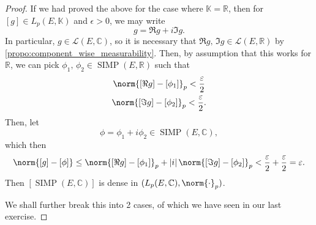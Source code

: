 \documentclass[notoc,notitlepage]{tufte-book}
\DeclareMathOperator{\SIMP}{SIMP}
\begin{document}
\begin{proof}
  If we had proved the above for the case where $\mathbb{K} = \mathbb{R}$,
  then for $[g] \in L_p(E, \mathbb{K})$ and $\epsilon > 0$,
  we may write
  \begin{equation*}
    g = \Re g + i \Im g.
  \end{equation*}
  In particular, $g \in \mathcal{L}(E, \mathbb{C})$,
  so it is necessary that $\Re g,\, \Im g \in \mathcal{L}(E, \mathbb{R})$ by
  \cref{propo:component_wise_measurability}.
  Then, by assumption that this works for $\mathbb{R}$,
  we can pick $\phi_1,\, \phi_2 \in \SIMP(E, \mathbb{R})$ such that
  \begin{gather*}
    \norm{[\Re g] - [\phi_1]}_p < \frac{\epsilon}{2} \\
    \norm{[\Im g] - [\phi_2]}_p < \frac{\epsilon}{2}.
  \end{gather*}
  Then, let
  \begin{equation*}
    \phi = \phi_1 + i \phi_2 \in \SIMP(E, \mathbb{C}),
  \end{equation*}
  which then
  \begin{equation*}
    \norm{[g] - [\phi]} \leq \norm{[\Re g] - [\phi_1]}_p + \abs{i} \norm{[\Im g] -
    [\phi_2]}_p < \frac{\epsilon}{2} + \frac{\epsilon}{2} = \epsilon.
  \end{equation*}
  Then $[\SIMP(E, \mathbb{C})]$ is dense in $(L_p(E, \mathbb{C}), \norm{\cdot}_p)$.

  \noindent
  We shall further break this into 2 cases,
  of which we have seen in our last exercise.


\end{proof}
\end{document}
